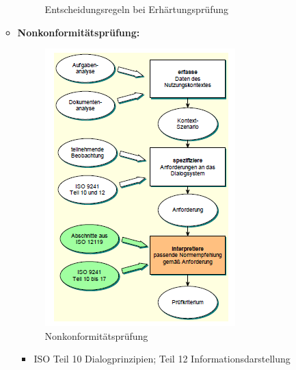 \begin{enumerate}
\begin{itemize}
\begin{figure}[!h]
			\caption{Entscheidungsregeln bei Erhärtungsprüfung}
		\end{figure}
		\item \textbf{Nonkonformitätsprüfung:}
		\begin{figure}[!h]
			\centering
			\includegraphics[scale=0.7]{img/nonkonformitaet.png}
			\caption{Nonkonformitätsprüfung}
		\end{figure}
		\begin{itemize}
			\item ISO Teil 10 Dialogprinzipien; Teil 12 Informationsdarstellung
		\end{itemize}
	\end{itemize}


\end{enumerate}
